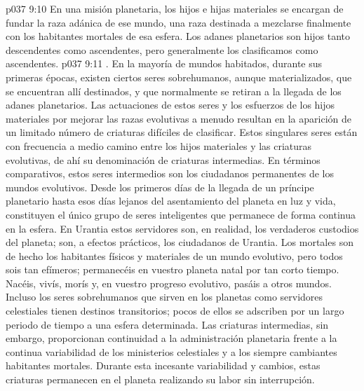 \vs p037 9:10 En una misión planetaria, los hijos e hijas materiales se encargan de fundar la raza adánica de ese mundo, una raza destinada a mezclarse finalmente con los habitantes mortales de esa esfera. Los adanes planetarios son hijos tanto descendentes como ascendentes, pero generalmente los clasificamos como ascendentes.
\vs p037 9:11 \pc {}. En la mayoría de mundos habitados, durante sus primeras épocas, existen ciertos seres sobrehumanos, aunque materializados, que se encuentran allí destinados, y que normalmente se retiran a la llegada de los adanes planetarios. Las actuaciones de estos seres y los esfuerzos de los hijos materiales por mejorar las razas evolutivas a menudo resultan en la aparición de un limitado número de criaturas difíciles de clasificar. Estos singulares seres están con frecuencia a medio camino entre los hijos materiales y las criaturas evolutivas, de ahí su denominación de criaturas intermedias. En términos comparativos, estos seres intermedios son los ciudadanos permanentes de los mundos evolutivos. Desde los primeros días de la llegada de un príncipe planetario hasta esos días lejanos del asentamiento del planeta en luz y vida, constituyen el único grupo de seres inteligentes que permanece de forma continua en la esfera. En Urantia estos servidores son, en realidad, los verdaderos custodios del planeta; son, a efectos prácticos, los ciudadanos de Urantia. Los mortales son de hecho los habitantes físicos y materiales de un mundo evolutivo, pero todos sois tan efímeros; permanecéis en vuestro planeta natal por tan corto tiempo. Nacéis, vivís, morís y, en vuestro progreso evolutivo, pasáis a otros mundos. Incluso los seres sobrehumanos que sirven en los planetas como servidores celestiales tienen destinos transitorios; pocos de ellos se adscriben por un largo periodo de tiempo a una esfera determinada. Las criaturas intermedias, sin embargo, proporcionan continuidad a la administración planetaria frente a la continua variabilidad de los ministerios celestiales y a los siempre cambiantes habitantes mortales. Durante esta incesante variabilidad y cambios, estas criaturas permanecen en el planeta realizando su labor sin interrupción.
